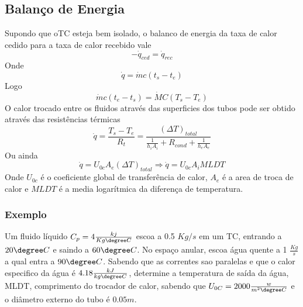\subsection{Balanço de Energia}
Supondo que oTC esteja bem isolado, o balanco de energia da taxa de calor cedido para a taxa de
calor recebido vale
\begin{equation}
    -\dot{q}_{ced} = \dot{q}_{rec}
\end{equation}
Onde
\begin{equation}
    \dot{q} = \dot{m} c (t_{s} - t_{e} )
\end{equation}
Logo
\begin{equation}
    \dot{m}c(t_{e} - t_{s} ) = \dot{M}C(T_{s} - T_{e} )
\end{equation}
O calor trocado entre os fluidos através das superficies dos tubos pode ser obtido através das
resistências térmicas 
\begin{equation}
    \dot{q} = \frac{T_{s} - T_{e} }{R_{t} } = \frac{(\Delta T)_{total}}{\frac{1}{h_{i} A_{i} } + R_{cond} + \frac{1}{h_{e} A_{e}  }}
\end{equation}
Ou ainda
\begin{equation}
    \dot{q} = U_{0c}A_{e} (\Delta T)_{total} \Rightarrow \dot{q} = U_{0c}A_{i} MLDT
\end{equation}
Onde \(U_{0c}\) é o coeficiente global de transferência de calor, \(A_{e}\) é a area de troca de
calor e \(MLDT\) é a media logarítmica da diferença de temperatura.
\subsubsection{Exemplo}
Um fluido líquido \(C_{p} = 4 \frac{kj}{Kg \degree C}\) escoa a 0.5 \(Kg/s\) em um TC, entrando a
\(20 \degree C\) e saindo a \(60 \degree C\). No espaço anular, escoa água quente a 1
\(\frac{Kg}{s}\) a qual entra a \(90 \degree C\). Sabendo que as correntes sao paralelas e que o
calor especifico da água é \(4.18 \frac{kJ}{kg \degree C}\), determine a temperatura de saída da
água, MLDT, comprimento do trocador de calor, sabendo que \(U_{0C} = 2000 \frac{w}{m ^{2} \degree C}
\) e o diâmetro externo do tubo é \(0.05 m\).
